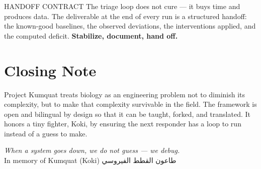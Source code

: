 \documentclass[12pt,oneside]{book}
\newcommand{\ar}[1]{\textarabic{#1}}
\begin{document}
\begin{kumbox}{HANDOFF CONTRACT}
The triage loop does not cure --- it buys time and produces data. The
deliverable at the end of every run is a structured handoff: the
known-good baselines, the observed deviations, the interventions applied,
and the computed deficit. \textbf{Stabilize, document, hand off.}
\end{kumbox}

\backmatter
\chapter{Closing Note}
Project Kumquat treats biology as an engineering problem not to diminish
its complexity, but to make that complexity survivable in the field. The
framework is open and bilingual by design so that it can be taught,
forked, and translated. It honors a tiny fighter, Koki, by ensuring the
next responder has a loop to run instead of a guess to make.

\begin{center}
\vspace{1em}
{\itshape\color{kumdeep}When a system goes down, we do not guess --- we debug.}\\[0.4em]
{\sffamily\color{kumgrey} In memory of Kumquat (Koki) \quad \ar{طاعون القطط الفيروسي}}
\end{center}
\end{document}

